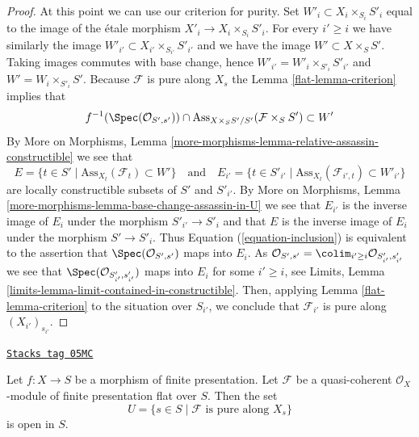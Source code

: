 \begin{proof}
\medskip\noindent
At this point we can use our criterion for purity.
Set $W'_i \subset X_i \times_{S_i} S'_i$ equal to the image of the
\'etale morphism $X'_i \to X_i \times_{S_i} S'_i$. For every $i' \geq i$
we have similarly the image $W'_{i'} \subset X_{i'} \times_{S_{i'}} S'_{i'}$
and we have the image $W' \subset X \times_S S'$. Taking images commutes
with base change, hence $W'_{i'} = W'_i \times_{S'_i} S'_{i'}$ and
$W' = W_i \times_{S'_i} S'$. Because
$\mathcal{F}$ is pure along $X_s$ the
Lemma \ref{flat-lemma-criterion}
implies that
\begin{equation}
\label{equation-inclusion}
f^{-1}(\Spec(\mathcal{O}_{S', s'})) \cap
\text{Ass}_{X \times_S S'/S'}(\mathcal{F} \times_S S') \subset W'
\end{equation}
By
More on Morphisms,
Lemma \ref{more-morphisms-lemma-relative-assassin-constructible}
we see that
$$
E = \{t \in S' \mid \text{Ass}_{X_t}(\mathcal{F}_t) \subset W' \}
\quad\text{and}\quad
E_{i'} = \{t \in S'_{i'} \mid
\text{Ass}_{X_t}(\mathcal{F}_{i', t}) \subset W'_{i'} \}
$$
are locally constructible subsets of $S'$ and $S'_{i'}$. By
More on Morphisms,
Lemma \ref{more-morphisms-lemma-base-change-assassin-in-U}
we see that $E_{i'}$ is the inverse image of $E_i$ under the morphism
$S'_{i'} \to S'_i$ and that $E$ is the inverse image of $E_i$ under
the morphism $S' \to S'_i$. Thus
Equation (\ref{equation-inclusion})
is equivalent to the assertion that
$\Spec(\mathcal{O}_{S', s'})$ maps into $E_i$. As
$\mathcal{O}_{S', s'} =
\colim_{i' \geq i} \mathcal{O}_{S'_{i'}, s'_{i'}}$
we see that $\Spec(\mathcal{O}_{S'_{i'}, s'_{i'}})$
maps into $E_i$ for some $i' \geq i$, see
Limits, Lemma \ref{limits-lemma-limit-contained-in-constructible}.
Then, applying
Lemma \ref{flat-lemma-criterion}
to the situation over $S_{i'}$,
we conclude that $\mathcal{F}_{i'}$ is pure along $(X_{i'})_{s_{i'}}$.
\end{proof}

\begin{lemma}
\label{flat-lemma-flat-finite-presentation-purity-open}
\href{https://stacks.math.columbia.edu/tag/05MC}{\texttt{Stacks tag 05MC}}

Let $f : X \to S$ be a morphism of finite presentation.
Let $\mathcal{F}$ be a quasi-coherent $\mathcal{O}_X$-module
of finite presentation flat over $S$. Then the set
$$
U = \{s \in S \mid \mathcal{F}\text{ is pure along }X_s\}
$$
is open in $S$.
\end{lemma}

